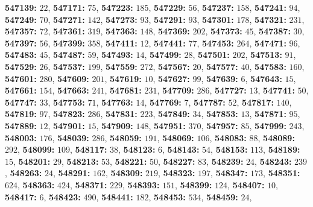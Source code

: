 \textsf{\bfseries 547139:} $22$, \textsf{\bfseries 547171:} $75$, \textsf{\bfseries 547223:} $185$, \textsf{\bfseries 547229:} $56$, \textsf{\bfseries 547237:} $158$, \textsf{\bfseries 547241:} $94$, \textsf{\bfseries 547249:} $70$, \textsf{\bfseries 547271:} $142$, \textsf{\bfseries 547273:} $93$, \textsf{\bfseries 547291:} $93$, \textsf{\bfseries 547301:} $178$, \textsf{\bfseries 547321:} $231$, \textsf{\bfseries 547357:} $72$, \textsf{\bfseries 547361:} $319$, \textsf{\bfseries 547363:} $148$, \textsf{\bfseries 547369:} $202$, \textsf{\bfseries 547373:} $45$, \textsf{\bfseries 547387:} $30$, \textsf{\bfseries 547397:} $56$, \textsf{\bfseries 547399:} $358$, \textsf{\bfseries 547411:} $12$, \textsf{\bfseries 547441:} $77$, \textsf{\bfseries 547453:} $264$, \textsf{\bfseries 547471:} $96$, \textsf{\bfseries 547483:} $45$, \textsf{\bfseries 547487:} $59$, \textsf{\bfseries 547493:} $14$, \textsf{\bfseries 547499:} $28$, \textsf{\bfseries 547501:} $202$, \textsf{\bfseries 547513:} $91$, \textsf{\bfseries 547529:} $26$, \textsf{\bfseries 547537:} $199$, \textsf{\bfseries 547559:} $272$, \textsf{\bfseries 547567:} $20$, \textsf{\bfseries 547577:} $40$, \textsf{\bfseries 547583:} $160$, \textsf{\bfseries 547601:} $280$, \textsf{\bfseries 547609:} $201$, \textsf{\bfseries 547619:} $10$, \textsf{\bfseries 547627:} $99$, \textsf{\bfseries 547639:} $6$, \textsf{\bfseries 547643:} $15$, \textsf{\bfseries 547661:} $154$, \textsf{\bfseries 547663:} $241$, \textsf{\bfseries 547681:} $231$, \textsf{\bfseries 547709:} $286$, \textsf{\bfseries 547727:} $13$, \textsf{\bfseries 547741:} $50$, \textsf{\bfseries 547747:} $33$, \textsf{\bfseries 547753:} $71$, \textsf{\bfseries 547763:} $14$, \textsf{\bfseries 547769:} $7$, \textsf{\bfseries 547787:} $52$, \textsf{\bfseries 547817:} $140$, \textsf{\bfseries 547819:} $97$, \textsf{\bfseries 547823:} $286$, \textsf{\bfseries 547831:} $223$, \textsf{\bfseries 547849:} $34$, \textsf{\bfseries 547853:} $13$, \textsf{\bfseries 547871:} $95$, \textsf{\bfseries 547889:} $12$, \textsf{\bfseries 547901:} $15$, \textsf{\bfseries 547909:} $148$, \textsf{\bfseries 547951:} $370$, \textsf{\bfseries 547957:} $85$, \textsf{\bfseries 547999:} $243$, \textsf{\bfseries 548003:} $176$, \textsf{\bfseries 548039:} $286$, \textsf{\bfseries 548059:} $191$, \textsf{\bfseries 548069:} $106$, \textsf{\bfseries 548083:} $88$, \textsf{\bfseries 548089:} $292$, \textsf{\bfseries 548099:} $109$, \textsf{\bfseries 548117:} $38$, \textsf{\bfseries 548123:} $6$, \textsf{\bfseries 548143:} $54$, \textsf{\bfseries 548153:} $113$, \textsf{\bfseries 548189:} $15$, \textsf{\bfseries 548201:} $29$, \textsf{\bfseries 548213:} $53$, \textsf{\bfseries 548221:} $50$, \textsf{\bfseries 548227:} $83$, \textsf{\bfseries 548239:} $24$, \textsf{\bfseries 548243:} $239$, \textsf{\bfseries 548263:} $24$, \textsf{\bfseries 548291:} $162$, \textsf{\bfseries 548309:} $219$, \textsf{\bfseries 548323:} $197$, \textsf{\bfseries 548347:} $173$, \textsf{\bfseries 548351:} $624$, \textsf{\bfseries 548363:} $424$, \textsf{\bfseries 548371:} $229$, \textsf{\bfseries 548393:} $151$, \textsf{\bfseries 548399:} $124$, \textsf{\bfseries 548407:} $10$, \textsf{\bfseries 548417:} $6$, \textsf{\bfseries 548423:} $490$, \textsf{\bfseries 548441:} $182$, \textsf{\bfseries 548453:} $534$, \textsf{\bfseries 548459:} $24$, 
